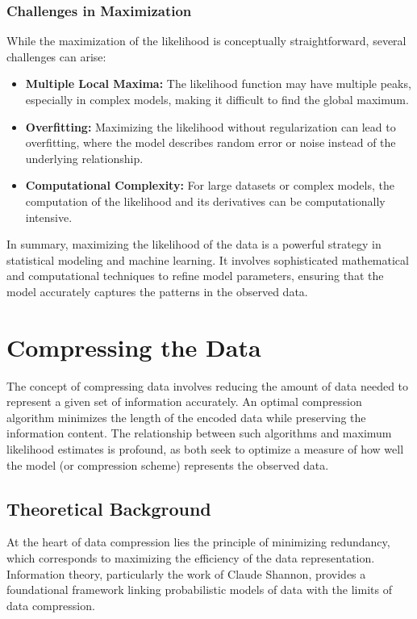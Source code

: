 \subsubsection{Challenges in Maximization}
While the maximization of the likelihood is conceptually straightforward, several challenges can arise:
\begin{itemize}
    \item \textbf{Multiple Local Maxima:} The likelihood function may have multiple peaks, especially in complex models, making it difficult to find the global maximum.
    \item \textbf{Overfitting:} Maximizing the likelihood without regularization can lead to overfitting, where the model describes random error or noise instead of the underlying relationship.
    \item \textbf{Computational Complexity:} For large datasets or complex models, the computation of the likelihood and its derivatives can be computationally intensive.
\end{itemize}

In summary, maximizing the likelihood of the data is a powerful strategy in statistical modeling and machine learning. It involves sophisticated mathematical and computational techniques to refine model parameters, ensuring that the model accurately captures the patterns in the observed data.

\section{Compressing the Data}

The concept of compressing data involves reducing the amount of data needed to represent a given set of information accurately. An optimal compression algorithm minimizes the length of the encoded data while preserving the information content. The relationship between such algorithms and maximum likelihood estimates is profound, as both seek to optimize a measure of how well the model (or compression scheme) represents the observed data.

\subsection{Theoretical Background}
At the heart of data compression lies the principle of minimizing redundancy, which corresponds to maximizing the efficiency of the data representation. Information theory, particularly the work of Claude Shannon, provides a foundational framework linking probabilistic models of data with the limits of data compression.

